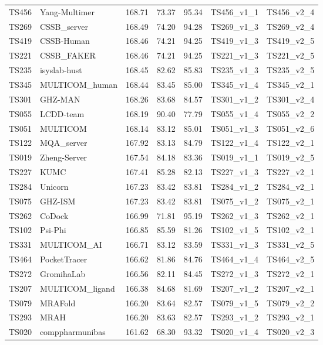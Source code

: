 \begin{longtable}{lllllll}
TS456 & Yang-Multimer & 168.71 & 73.37 & 95.34 & TS456\_v1\_1 & TS456\_v2\_4 \\ 
TS269 & CSSB\_server & 168.49 & 74.20 & 94.28 & TS269\_v1\_3 & TS269\_v2\_4 \\ 
TS419 & CSSB-Human & 168.46 & 74.21 & 94.25 & TS419\_v1\_3 & TS419\_v2\_5 \\ 
TS221 & CSSB\_FAKER & 168.46 & 74.21 & 94.25 & TS221\_v1\_3 & TS221\_v2\_5 \\ 
TS235 & isyslab-hust & 168.45 & 82.62 & 85.83 & TS235\_v1\_3 & TS235\_v2\_5 \\ 
TS345 & MULTICOM\_human & 168.44 & 83.45 & 85.00 & TS345\_v1\_4 & TS345\_v2\_1 \\ 
TS301 & GHZ-MAN & 168.26 & 83.68 & 84.57 & TS301\_v1\_2 & TS301\_v2\_4 \\ 
TS055 & LCDD-team & 168.19 & 90.40 & 77.79 & TS055\_v1\_4 & TS055\_v2\_2 \\ 
TS051 & MULTICOM & 168.14 & 83.12 & 85.01 & TS051\_v1\_3 & TS051\_v2\_6 \\ 
TS122 & MQA\_server & 167.92 & 83.13 & 84.79 & TS122\_v1\_4 & TS122\_v2\_1 \\ 
TS019 & Zheng-Server & 167.54 & 84.18 & 83.36 & TS019\_v1\_1 & TS019\_v2\_5 \\ 
TS227 & KUMC & 167.41 & 85.28 & 82.13 & TS227\_v1\_3 & TS227\_v2\_1 \\ 
TS284 & Unicorn & 167.23 & 83.42 & 83.81 & TS284\_v1\_2 & TS284\_v2\_1 \\ 
TS075 & GHZ-ISM & 167.23 & 83.42 & 83.81 & TS075\_v1\_2 & TS075\_v2\_1 \\ 
TS262 & CoDock & 166.99 & 71.81 & 95.19 & TS262\_v1\_3 & TS262\_v2\_1 \\ 
TS102 & Psi-Phi & 166.85 & 85.59 & 81.26 & TS102\_v1\_5 & TS102\_v2\_1 \\ 
TS331 & MULTICOM\_AI & 166.71 & 83.12 & 83.59 & TS331\_v1\_3 & TS331\_v2\_5 \\ 
TS464 & PocketTracer & 166.62 & 81.86 & 84.76 & TS464\_v1\_4 & TS464\_v2\_5 \\ 
TS272 & GromihaLab & 166.56 & 82.11 & 84.45 & TS272\_v1\_3 & TS272\_v2\_1 \\ 
TS207 & MULTICOM\_ligand & 166.38 & 84.68 & 81.69 & TS207\_v1\_2 & TS207\_v2\_1 \\ 
TS079 & MRAFold & 166.20 & 83.64 & 82.57 & TS079\_v1\_5 & TS079\_v2\_2 \\ 
TS293 & MRAH & 166.20 & 83.63 & 82.57 & TS293\_v1\_2 & TS293\_v2\_1 \\ 
TS020 & comppharmunibas & 161.62 & 68.30 & 93.32 & TS020\_v1\_4 & TS020\_v2\_3 \\ 

\end{longtable}
